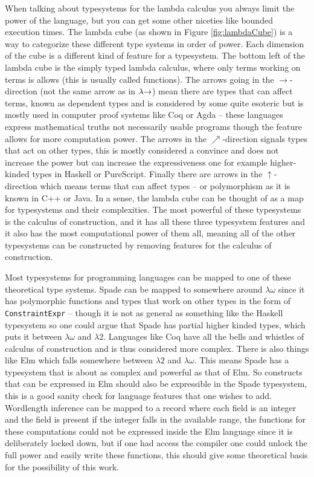 When talking about typesystems for the lambda calculus you always limit the power of the language, but you can get some other niceties like bounded execution times. The lambda cube (as shown in Figure \ref{fig:lambdaCube}) is a way to categorize these different type systems in order of power. Each dimension of the cube is a different kind of feature for a typesystem. The bottom left of the lambda cube is the simply typed lambda calculus, where only terms working on terms is allows (this is usually called functions). The arrows going in the $\rightarrow$-direction (not the same arrow as in $\lambda{}\hspace{-0.3em}\rightarrow$) mean there are types that can affect terms, known as dependent types and is considered by some quite esoteric but is mostly used in computer proof systems like Coq or Agda \cite{src:Coq, src:Agda} -- these languages express mathematical truths not necessarily usable programs though the feature allows for more computation power. The arrows in the $\nearrow$-direction signals types that act on other types, this is mostly considered a convince and does not increase the power but can increase the expressiveness one for example higher-kinded types in Haskell or PureScript. Finally there are arrows in the $\uparrow$-direction which means terms that can affect types -- or polymorphism as it is known in C++ or Java. In a sense, the lambda cube can be thought of as a map for typesystems and their complexities. The most powerful of these typesystems is the calculus of construction, and it has all these three typesystem features and it also has the most computational power of them all, meaning all of the other typesystems can be constructed by removing features for the calculus of construction.

Most typesystems for programming languages can be mapped to one of these theoretical type systems. Spade can be mapped to somewhere around $\lambda\omega$ since it has polymorphic functions and types that work on other types in the form of \verb+ConstraintExpr+ -- though it is not as general as something like the Haskell typesystem so one could argue that Spade has partial higher kinded types, which puts it between $\lambda\omega$ and $\lambda{}2$. Languages like Coq have all the bells and whistles of calculus of construction and is thus considered more complex. There is also things like Elm \cite{src:Elm} which falls somewhere between $\lambda{}2$ and $\lambda\omega$. This means Spade has a typesystem that is about as complex and powerful as that of Elm. So constructs that can be expressed in Elm should also be expressible in the Spade typesystem, this is a good sanity check for language features that one wishes to add. Wordlength inference can be mapped to a record where each field is an integer and the field is present if the integer falls in the available range, the functions for these computations could not be expressed inside the Elm language since it is deliberately locked down, but if one had access the compiler one could unlock the full power and easily write these functions, this should give some theoretical basis for the possibility of this work.

